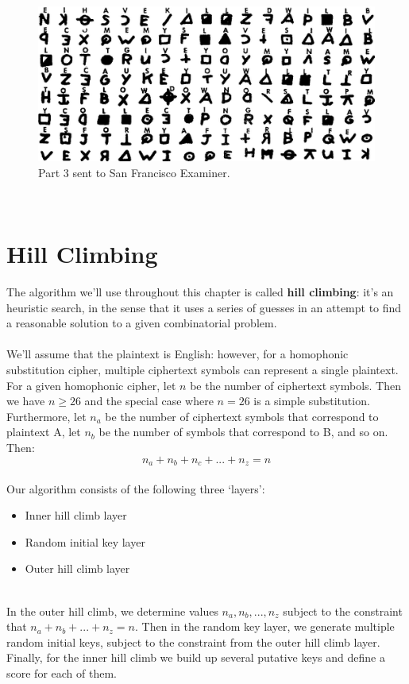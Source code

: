 \documentclass[Lau,binding=0.6cm,oneside]{sapthesis}
\begin{document}
\begin{figure}[H]
\includegraphics[scale=0.7]{zodiac_408_3}
\centering
\caption{Part 3 sent to San Francisco Examiner.}
\centering
\end{figure}
\ \\

\section{Hill Climbing}
The algorithm we'll use throughout this chapter is called \textbf{hill climbing}: it's an heuristic search, in the sense that it uses a series of guesses in an attempt to find a reasonable solution to a given combinatorial problem.\\\\
We'll assume that the plaintext is English: however, for a homophonic substitution cipher, multiple ciphertext symbols can represent a single plaintext. For a given homophonic cipher, let $n$ be the number of ciphertext symbols. Then we have $ n \geq 26 $ and the special case where $ n = 26 $ is a simple substitution. Furthermore, let $n_a$ be the number of ciphertext symbols that correspond to plaintext \textsf{A}, let $n_b$ be the number of symbols that correspond to \textsf{B}, and so on. Then:\\

\begin{equation}
n_a + n_b + n_c + ... + n_z = n
\end{equation}
\ \\
Our algorithm consists of the following three `layers':
\begin{itemize}
\item Inner hill climb layer
\item Random initial key layer
\item Outer hill climb layer
\end{itemize}
\ \\
In the outer hill climb, we determine values $n_a, n_b, ..., n_z$ subject to the constraint that $n_a + n_b + ... + n_z = n$. Then in the random key layer, we generate multiple random initial keys, subject to the constraint from the outer hill climb layer. Finally, for the inner hill climb we build up several putative keys and define a score for each of them.\\\\
\end{document}
